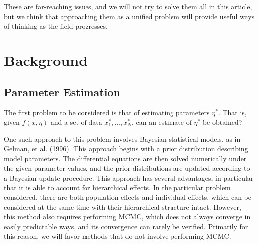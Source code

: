 \documentclass[12pt]{article}
\begin{document}


These are far-reaching issues, and we will not try to solve them all in this article, but we think that approaching them as a unified problem will provide useful ways of thinking as the field progresses.





\section{Background}

\subsection{Parameter Estimation}

The first problem to be considered is that of estimating parameters $\eta^*$. That is, given $f(x,\eta)$ and a set of data $x^*_1, \ldots , x^*_N$, can an estimate of $\eta^*$ be obtained?

One such approach to this problem involves Bayesian statistical models, as in Gelman, et al. (1996). This approach begins with a prior distribution describing model parameters. The differential equations are then solved numerically under the given parameter values, and the prior distributions are updated according to a Bayesian update procedure. This approach has several advantages, in particular that it is able to account for hierarchical effects. In the particular problem considered, there are both population effects and individual effects, which can be considered at the same time with their hierarchical structure intact.\cite{gelman} However, this method also requires performing MCMC, which does not always converge in easily predictable ways, and its convergence can rarely be verified.\cite{vehtari} Primarily for this reason, we will favor methods that do not involve performing MCMC.
\end{document}
